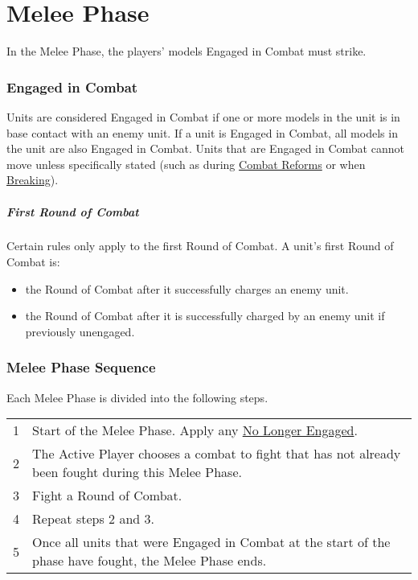 \part{Melee Phase}
\label{melee_phase}

In the Melee Phase, the players' models Engaged in Combat must strike.

\section{Engaged in Combat}
\label{engaged_in_combat}

Units are considered Engaged in Combat if one or more models in the unit is in base contact with an enemy unit. If a unit is Engaged in Combat, all models in the unit are also Engaged in Combat. Units that are Engaged in Combat cannot move unless specifically stated (such as during \hyperref[combat_reform]{Combat Reforms} or when \hyperref[break_test]{Breaking}).

\subsubsection{First Round of Combat}

Certain rules only apply to the first Round of Combat. A unit's first Round of Combat is:

\begin{itemize}[label={-}]
\item the Round of Combat after it successfully charges an enemy unit.
\item the Round of Combat after it is successfully charged by an enemy unit if previously unengaged.
\end{itemize}

\section{Melee Phase Sequence}
\label{melee_phase_sequence}

Each Melee Phase is divided into the following steps.\par

\hspace*{0.3cm}
\begin{tabular}{c | m{14cm}}
1 & Start of the Melee Phase. Apply any \hyperref[no_longer_engaged]{No Longer Engaged}.\\
2 & The Active Player chooses a combat to fight that has not already been fought during this Melee Phase.\\
3  & Fight a Round of Combat. \\
4 & Repeat steps 2 and 3. \\
5 & Once all units that were Engaged in Combat at the start of the phase have fought, the Melee Phase ends.\\
\end{tabular}
\par

